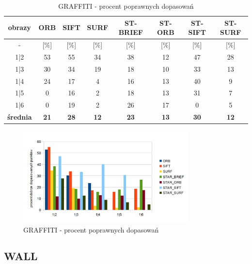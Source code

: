 \begin{table}[htbp]
  \centering
  \caption{GRAFFITI - procent poprawnych dopasowań}
    \begin{tabular}{|c|c|c|c|c|c|c|c|}\hline
    obrazy & \textbf{ORB} & \textbf{SIFT} & \textbf{SURF} & \textbf{ST-BRIEF} & \textbf{ST-ORB} & \textbf{ST-SIFT} & \textbf{ST-SURF} \\\hline
     - & [\%] & [\%] & [\%] & [\%] & [\%] & [\%] & [\%] \\\hline
    1|2 & 53 & 55 & 34 & 38 & 12 & 47 & 28 \\
    1|3 & 30 & 34 & 19 & 18 & 10 & 33 & 13 \\
    1|4 & 24 & 17 & 4 & 16 & 13 & 40 & 9 \\
    1|5 & 0 & 16 & 2 & 18 & 13 & 31 & 7 \\
    1|6 & 0 & 19 & 2 & 26 & 17 & 0 & 5 \\\hline
    \textbf{średnia} & \textbf{21} & \textbf{28} & \textbf{12} & \textbf{23} & \textbf{13} & \textbf{30} & \textbf{12} \\\hline
   
    \end{tabular}%
  \label{tab:graffiti_m2}%
\end{table}%


\begin{figure}
\centering
\includegraphics[width=0.8\textwidth]{pict/mikolajczyk/graff/m2.png}
\caption{GRAFFITI - procent poprawnych dopasowań}
\end{figure}




\FloatBarrier
\subsection{WALL}

